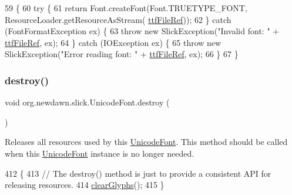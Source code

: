 \begin{DoxyCode}
59                                                                              \{
60         \textcolor{keywordflow}{try} \{
61             \textcolor{keywordflow}{return} Font.createFont(Font.TRUETYPE\_FONT, ResourceLoader.getResourceAsStream(
      \mbox{\hyperlink{classorg_1_1newdawn_1_1slick_1_1_unicode_font_a2f13dde71bdabcab77c49030a4af17f2}{ttfFileRef}}));
62         \} \textcolor{keywordflow}{catch} (FontFormatException ex) \{
63             \textcolor{keywordflow}{throw} \textcolor{keyword}{new} SlickException(\textcolor{stringliteral}{"Invalid font: "} + \mbox{\hyperlink{classorg_1_1newdawn_1_1slick_1_1_unicode_font_a2f13dde71bdabcab77c49030a4af17f2}{ttfFileRef}}, ex);
64         \} \textcolor{keywordflow}{catch} (IOException ex) \{
65             \textcolor{keywordflow}{throw} \textcolor{keyword}{new} SlickException(\textcolor{stringliteral}{"Error reading font: "} + \mbox{\hyperlink{classorg_1_1newdawn_1_1slick_1_1_unicode_font_a2f13dde71bdabcab77c49030a4af17f2}{ttfFileRef}}, ex);
66         \}
67     \}
\end{DoxyCode}
\mbox{\label{classorg_1_1newdawn_1_1slick_1_1_unicode_font_a41c92f27f67ef3ec3ce7b6849c0d6612}} 
\subsubsection{\texorpdfstring{destroy()}{destroy()}}
{\footnotesize\ttfamily void org.\+newdawn.\+slick.\+Unicode\+Font.\+destroy (\begin{DoxyParamCaption}{ }\end{DoxyParamCaption})\hspace{0.3cm}{\ttfamily [inline]}}

Releases all resources used by this \mbox{\hyperlink{classorg_1_1newdawn_1_1slick_1_1_unicode_font}{Unicode\+Font}}. This method should be called when this \mbox{\hyperlink{classorg_1_1newdawn_1_1slick_1_1_unicode_font}{Unicode\+Font}} instance is no longer needed. 
\begin{DoxyCode}
412                            \{
413         \textcolor{comment}{// The destroy() method is just to provide a consistent API for releasing resources.}
414         \mbox{\hyperlink{classorg_1_1newdawn_1_1slick_1_1_unicode_font_acb2f2c11e0827f39efb939bc10e5f755}{clearGlyphs}}();
415     \}
\end{DoxyCode}
\mbox{\label{classorg_1_1newdawn_1_1slick_1_1_unicode_font_a775b5c077b9f95f72955344cb7ff3164}} 
